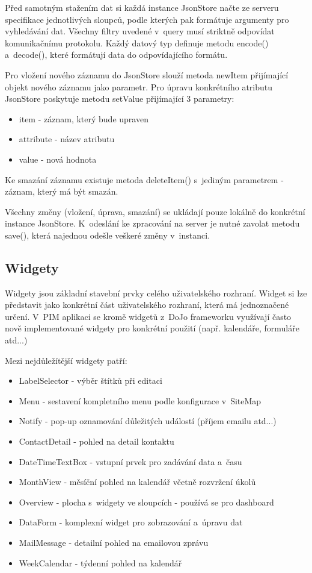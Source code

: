 \documentclass[bc,male,html,dept460]{diploma}				%
\begin{document}
Před samotným stažením dat si každá instance JsonStore načte ze serveru specifikace jednotlivých sloupců, podle kterých pak formátuje argumenty pro vyhledávání dat. Všechny filtry uvedené v~query musí striktně odpovídat komunikačnímu protokolu.
Každý datový typ definuje metodu encode() a~decode(), které formátují data do odpovídajícího formátu.

Pro vložení nového záznamu do JsonStore slouží metoda newItem přijímající objekt nového záznamu jako parametr.
Pro úpravu konkrétního atributu JsonStore poskytuje metodu setValue přijímající 3 parametry:
\begin{itemize}
 \item item - záznam, který bude upraven
 \item attribute - název atributu
 \item value - nová hodnota
\end{itemize}
Ke smazání záznamu existuje metoda deleteItem() s~jediným parametrem - záznam, který má být smazán.

Všechny změny (vložení, úprava, smazání) se ukládají pouze lokálně do konkrétní instance JsonStore. K~odeslání ke zpracování na server je nutné zavolat metodu save(), která najednou odešle veškeré změny v~instanci.


\subsection{Widgety}
Widgety jsou základní stavební prvky celého uživatelského rozhraní. Widget si lze představit jako konkrétní část uživatelského rozhraní, která má jednoznačené určení. V~PIM aplikaci se kromě widgetů z~DoJo frameworku využívají často nově implementované widgety pro konkrétní použití (např. kalendáře, formuláře atd...)

Mezi nejdůležítější widgety patří:
\begin{itemize}
 \item LabelSelector - výběr štítků při editaci
 \item Menu - sestavení kompletního menu podle konfigurace v~SiteMap
 \item Notify - pop-up oznamování důležitých událostí (příjem emailu atd...)
 \item ContactDetail - pohled na detail kontaktu
 \item DateTimeTextBox - vstupní prvek pro zadávání data a~času
 \item MonthView - měsíční pohled na kalendář včetně rozvržení úkolů
 \item Overview - plocha s~widgety ve sloupcích - používá se pro dashboard
 \item DataForm - komplexní widget pro zobrazování a~úpravu dat
 \item MailMessage - detailní pohled na emailovou zprávu
 \item WeekCalendar - týdenní pohled na kalendář
\end{itemize}
\end{document}
